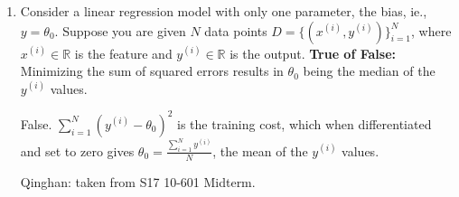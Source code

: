 \begin{enumerate}
    \item Consider a linear regression model with only one parameter, the bias, ie., $y=\theta_0$. Suppose you are given $N$ data points $D = \{(x^{(i)},y^{(i)})\}_{i=1}^N$, where $x^{(i)} \in \mathbb{R}$ is the feature and $y^{(i)} \in \mathbb{R}$ is the output. \textbf{True of False:} Minimizing the sum of squared errors results in $\theta_0$ being the median of the $y^{(i)}$ values.
    
    \begin{soln}
    False. $\sum_{i=1}^N(y^{(i)}-\theta_0)^2$ is the training cost, which when differentiated and set to zero gives $\theta_0 = \frac{\sum_{i=1}^N y^{(i)}}{N}$, the mean of the $y^{(i)}$ values.
    \end{soln}
    
    \begin{qauthor}
    Qinghan: taken from S17 10-601 Midterm. 
    \end{qauthor}
    
\end{enumerate}

